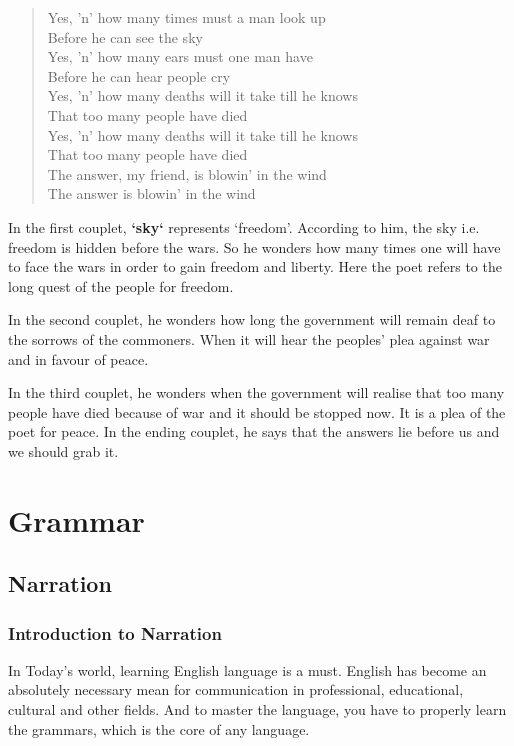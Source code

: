 \documentclass[a4paper,12pt]{book}
\begin{document}
\begin{verse}
Yes, 'n' how many times must a man look up\\[0pt]
Before he can see the sky\\[0pt]
Yes, 'n' how many ears must one man have\\[0pt]
Before he can hear people cry\\[0pt]
Yes, 'n' how many deaths will it take till he knows\\[0pt]
That too many people have died\\[0pt]
Yes, 'n' how many deaths will it take till he knows\\[0pt]
That too many people have died\\[0pt]
The answer, my friend, is blowin' in the wind\\[0pt]
The answer is blowin' in the wind\\[0pt]
\end{verse}

In the first couplet, \textbf{‘sky‘} represents ‘freedom’. According to him, the sky i.e. freedom is hidden before the wars. So he wonders how many times one will have to face the wars in order to gain freedom and liberty. Here the poet refers to the long quest of the people for freedom.

In the second couplet, he wonders how long the government will remain deaf to the sorrows of the commoners. When it will hear the peoples’ plea against war and in favour of peace.

In the third couplet, he wonders when the government will realise that too many people have died because of war and it should be stopped now. It is a plea of the poet for peace. In the ending couplet, he says that the answers lie before us and we should grab it.

\part{Grammar}
\label{sec:org4bc0efb}

\chapter{Narration}
\label{sec:org10fea99}
\section{Introduction to Narration}
\label{sec:orgbbac99a}

In Today’s world, learning English language is a must. English has become an absolutely necessary mean for communication in professional, educational, cultural and other fields. And to master the language, you have to properly learn the grammars, which is the core of any language. 
\end{document}
